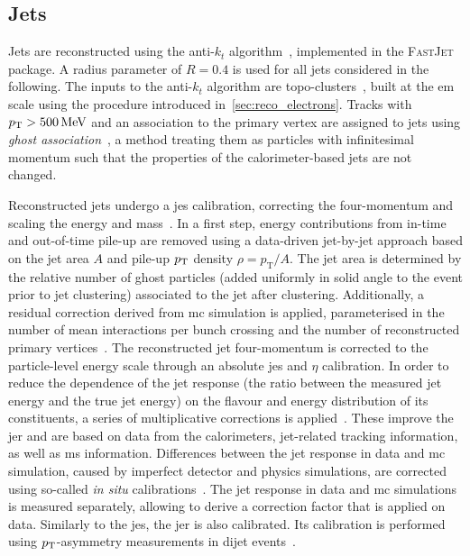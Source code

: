 \subsection{Jets}\label{sec:jets}

Jets are reconstructed using the anti-$k_t$ algorithm~\cite{Cacciari:2008gp}, implemented in the \textsc{FastJet}~\cite{Fastjet,Cacciari:2006sm} package.
A radius parameter of $R=0.4$ is used for all jets considered in the following. The inputs to the anti-$k_t$ algorithm are topo-clusters~\cite{Aad:2020flx}, built at the \gls{em} scale using the procedure introduced in~\cref{sec:reco_electrons}.
Tracks with $\pt > \SI{500}{\MeV}$ and an association to the primary vertex are assigned to jets using \textit{ghost association}~\cite{Cacciari:2007fd}, a method treating them as particles with infinitesimal momentum such that the properties of the calorimeter-based jets are not changed. 

Reconstructed jets undergo a \gls{jes} calibration, correcting the four-momentum and scaling the energy and mass~\cite{Aad:2020flx}.
In a first step, energy contributions from in-time and out-of-time pile-up are removed using a data-driven jet-by-jet approach based on the jet area $A$ and pile-up $p_{\mathrm{T}}$ density $\rho = p_\mathrm{T}/A$. The jet area is determined by the relative number of ghost particles (added uniformly in solid angle to the event prior to jet clustering) associated to the jet after clustering. 
Additionally, a residual correction derived from \gls{mc} simulation is applied, parameterised in the number of mean interactions per bunch crossing and the number of reconstructed primary vertices~\cite{Aad:2020flx,Cacciari:2007fd}.
The reconstructed jet four-momentum is corrected to the particle-level energy scale through an absolute \gls{jes} and $\eta$ calibration.
In order to reduce the dependence of the jet response (\ie the ratio between the measured jet energy and the true jet energy) on the flavour and energy distribution of its constituents, a series of multiplicative corrections is applied~\cite{PERF-2011-03}.
These improve the \gls{jer} and are based on data from the calorimeters, jet-related tracking information, as well as \gls{ms} information.
Differences between the jet response in data and \gls{mc} simulation, caused by imperfect detector and physics simulations, are corrected using so-called \textit{in situ} calibrations~\cite{Aad:2020flx}.
The jet response in data and \gls{mc} simulations is measured separately, allowing to derive a correction factor that is applied on data.
Similarly to the \gls{jes}, the \gls{jer} is also calibrated. Its calibration is performed using $p_{\mathrm{T}}$-asymmetry measurements in dijet events~\cite{PERF-2014-02}.

